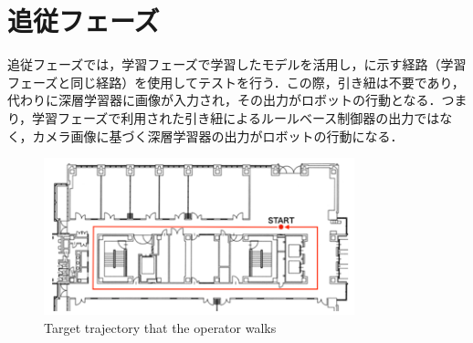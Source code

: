 
\section{追従フェーズ}

  追従フェーズでは，学習フェーズで学習したモデルを活用し，に示す経路（学習フェーズと同じ経路）を使用してテストを行う．この際，引き紐は不要であり，代わりに深層学習器に画像が入力され，その出力がロボットの行動となる．つまり，学習フェーズで利用された引き紐によるルールベース制御器の出力ではなく，カメラ画像に基づく深層学習器の出力がロボットの行動になる．

  \begin{figure}[h]
    \centering
    \includegraphics[keepaspectratio, scale=0.70] {images/okada_route.png}
    \caption{Target trajectory that the operator walks \cite{okada}}
    \label{Fig:okada_route}
  \end{figure}

\newpage